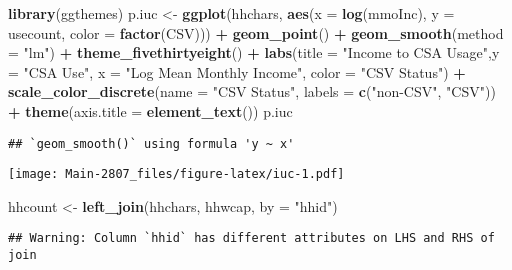 \documentclass[
]{article}
\newenvironment{Shaded}{\begin{snugshade}}{\end{snugshade}}
\newcommand{\DataTypeTok}[1]{\textcolor[rgb]{0.13,0.29,0.53}{#1}}
\newcommand{\DecValTok}[1]{\textcolor[rgb]{0.00,0.00,0.81}{#1}}
\newcommand{\KeywordTok}[1]{\textcolor[rgb]{0.13,0.29,0.53}{\textbf{#1}}}
\newcommand{\NormalTok}[1]{#1}
\newcommand{\OperatorTok}[1]{\textcolor[rgb]{0.81,0.36,0.00}{\textbf{#1}}}
\newcommand{\StringTok}[1]{\textcolor[rgb]{0.31,0.60,0.02}{#1}}
\begin{document}
\begin{Shaded}
\begin{Highlighting}[]
\KeywordTok{library}\NormalTok{(ggthemes)}
\NormalTok{p.iuc <-}\StringTok{ }\KeywordTok{ggplot}\NormalTok{(hhchars, }\KeywordTok{aes}\NormalTok{(}\DataTypeTok{x =} \KeywordTok{log}\NormalTok{(mmoInc), }\DataTypeTok{y =}\NormalTok{ usecount, }\DataTypeTok{color =} \KeywordTok{factor}\NormalTok{(CSV))) }\OperatorTok{+}
\StringTok{  }\KeywordTok{geom_point}\NormalTok{() }\OperatorTok{+}
\StringTok{  }\KeywordTok{geom_smooth}\NormalTok{(}\DataTypeTok{method =} \StringTok{"lm"}\NormalTok{) }\OperatorTok{+}
\StringTok{  }\KeywordTok{theme_fivethirtyeight}\NormalTok{() }\OperatorTok{+}
\StringTok{  }\KeywordTok{labs}\NormalTok{(}\DataTypeTok{title =} \StringTok{"Income to CSA Usage"}\NormalTok{,}\DataTypeTok{y =} \StringTok{"CSA Use"}\NormalTok{, }\DataTypeTok{x =} \StringTok{"Log Mean Monthly Income"}\NormalTok{, }\DataTypeTok{color =} \StringTok{"CSV Status"}\NormalTok{) }\OperatorTok{+}
\StringTok{  }\KeywordTok{scale_color_discrete}\NormalTok{(}\DataTypeTok{name =} \StringTok{"CSV Status"}\NormalTok{, }\DataTypeTok{labels =} \KeywordTok{c}\NormalTok{(}\StringTok{"non-CSV"}\NormalTok{, }\StringTok{"CSV"}\NormalTok{)) }\OperatorTok{+}
\StringTok{  }\KeywordTok{theme}\NormalTok{(}\DataTypeTok{axis.title =} \KeywordTok{element_text}\NormalTok{())}
\NormalTok{p.iuc}
\end{Highlighting}
\end{Shaded}

\begin{verbatim}
## `geom_smooth()` using formula 'y ~ x'
\end{verbatim}

\texttt{[image: Main-2807\_files/figure-latex/iuc-1.pdf]}

\begin{Shaded}
\begin{Highlighting}[]
\NormalTok{hhcount <-}\StringTok{ }\KeywordTok{left_join}\NormalTok{(hhchars, hhwcap, }\DataTypeTok{by =} \StringTok{"hhid"}\NormalTok{)}
\end{Highlighting}
\end{Shaded}

\begin{verbatim}
## Warning: Column `hhid` has different attributes on LHS and RHS of join
\end{verbatim}

\begin{Shaded}
\end{Shaded}
\end{document}
